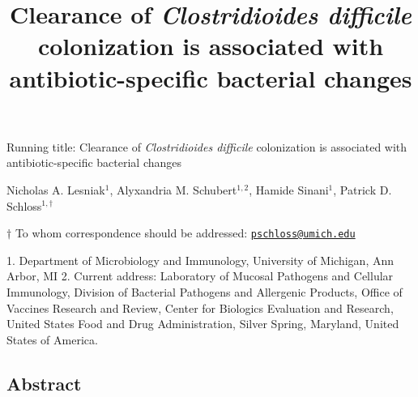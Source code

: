 \documentclass[11pt,]{article}
\title{\textbf{Clearance of \emph{Clostridioides difficile}
colonization is associated with antibiotic-specific bacterial changes}}
\author{}
\date{}
\begin{document}
\maketitle

\vspace{30mm}

Running title: Clearance of \emph{Clostridioides difficile} colonization
is associated with antibiotic-specific bacterial changes

\vspace{20mm}

Nicholas A. Lesniak\(^1\), Alyxandria M. Schubert\(^{1,2}\), Hamide
Sinani\(^1\), Patrick D. Schloss\(^{1,\dagger}\)

\vspace{30mm}

\(\dagger\) To whom correspondence should be addressed:
\href{mailto:pschloss@umich.edu}{\nolinkurl{pschloss@umich.edu}}

1. Department of Microbiology and Immunology, University of Michigan,
Ann Arbor, MI 2. Current address: Laboratory of Mucosal Pathogens and
Cellular Immunology, Division of Bacterial Pathogens and Allergenic
Products, Office of Vaccines Research and Review, Center for Biologics
Evaluation and Research, United States Food and Drug Administration,
Silver Spring, Maryland, United States of America.

\newpage
\linenumbers

\hypertarget{abstract}{%
\subsection{Abstract}\label{abstract}}
\end{document}
